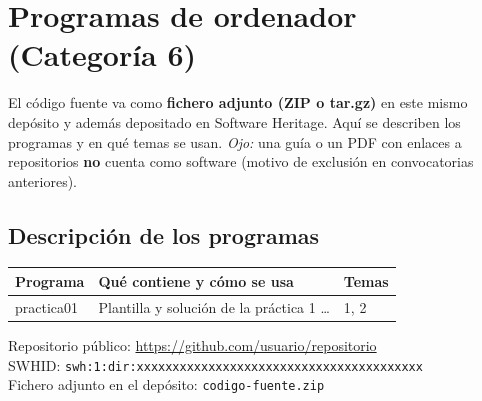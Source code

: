 \chapter{Programas de ordenador (Categoría 6)}

\begin{introcategoria}
El código fuente va como \textbf{fichero adjunto (ZIP o tar.gz)} en este mismo depósito
y además depositado en Software Heritage. Aquí se describen los programas y en qué temas
se usan. \emph{Ojo:} una guía o un PDF con enlaces a repositorios \textbf{no} cuenta como
software (motivo de exclusión en convocatorias anteriores).
\end{introcategoria}

\section{Descripción de los programas}
\begin{tabularx}{\textwidth}{@{}l X l@{}}
\toprule
\textbf{Programa} & \textbf{Qué contiene y cómo se usa} & \textbf{Temas}\\
\midrule
practica01 & Plantilla y solución de la práctica 1 \ldots & 1, 2\\
\bottomrule
\end{tabularx}

\bigskip
\noindent Repositorio público: \url{https://github.com/usuario/repositorio}\\
SWHID: \texttt{swh:1:dir:xxxxxxxxxxxxxxxxxxxxxxxxxxxxxxxxxxxxxxxx}\\
Fichero adjunto en el depósito: \texttt{codigo-fuente.zip}

